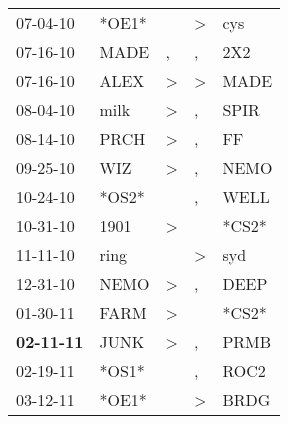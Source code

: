 \begin{supertabular}{p{0.07\textwidth}p{0.06\textwidth}p{0.02\textwidth}p{0.02\textwidth}p{0.06\textwidth}}
          07-04-10\textsuperscript{} &                            *OE1* &                  &     \textgreater &            cys\textsuperscript{} \\
          07-16-10\textsuperscript{} &           MADE\textsuperscript{} &                , &                , &            2X2\textsuperscript{} \\
          07-16-10\textsuperscript{} &           ALEX\textsuperscript{} &     \textgreater &     \textgreater &           MADE\textsuperscript{} \\
          08-04-10\textsuperscript{} &           milk\textsuperscript{} &     \textgreater &                , &           SPIR\textsuperscript{} \\
          08-14-10\textsuperscript{} &           PRCH\textsuperscript{} &     \textgreater &                , &             FF\textsuperscript{} \\
          09-25-10\textsuperscript{} &            WIZ\textsuperscript{} &     \textgreater &                , &           NEMO\textsuperscript{} \\
          10-24-10\textsuperscript{} &                            *OS2* &                  &                , &           WELL\textsuperscript{} \\
          10-31-10\textsuperscript{} &           1901\textsuperscript{} &     \textgreater &                  &                            *CS2* \\
          11-11-10\textsuperscript{} &           ring\textsuperscript{} &                  &     \textgreater &            syd\textsuperscript{} \\
          12-31-10\textsuperscript{} &           NEMO\textsuperscript{} &     \textgreater &                , &           DEEP\textsuperscript{} \\
          01-30-11\textsuperscript{} &           FARM\textsuperscript{} &     \textgreater &                  &                            *CS2* \\
 \textbf{02-11-11\textsuperscript{}} &           JUNK\textsuperscript{} &     \textgreater &                , &           PRMB\textsuperscript{} \\
          02-19-11\textsuperscript{} &                            *OS1* &                  &                , &           ROC2\textsuperscript{} \\
          03-12-11\textsuperscript{} &                            *OE1* &                  &     \textgreater &           BRDG\textsuperscript{} \\

\end{supertabular}
